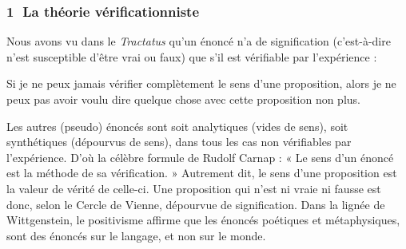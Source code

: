 \subsubsection*{\textcircled{\scriptsize 1} La théorie vérificationniste}
Nous avons vu dans le \textit{Tractatus} qu’un énoncé n’a de signification (c’est-à-dire n’est susceptible d’être vrai ou faux) que s’il est vérifiable par l’expérience :

\begin{lecture}{}
Si je ne peux jamais vérifier complètement le sens d’une proposition, alors je ne peux pas avoir voulu dire quelque chose avec cette proposition non plus.
\end{lecture}

Les autres (pseudo) énoncés sont soit analytiques (vides de sens), soit synthétiques (dépourvus de sens), dans tous les cas non vérifiables par l’expérience. D’où la célèbre formule de Rudolf Carnap : « Le sens d’un énoncé est la méthode de sa vérification. » Autrement dit, le sens d’une proposition est la valeur de vérité de celle-ci. Une proposition qui n’est ni vraie ni fausse est donc, selon le Cercle de Vienne, dépourvue de signification. Dans la lignée de Wittgenstein, le positivisme affirme que les énoncés poétiques et métaphysiques, sont des énoncés sur le langage, et non sur le monde.

